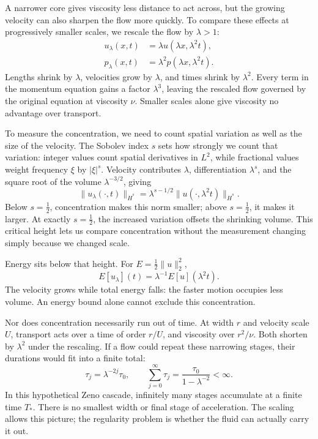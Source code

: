 A narrower core gives viscosity less distance to act across, but the
growing velocity can also sharpen the flow more quickly. To compare these
effects at progressively smaller scales, we rescale the flow by
\(\lambda>1\):
\[
 \begin{aligned}
 u_\lambda(x,t)&=\lambda u(\lambda x,\lambda^2t),\\
 p_\lambda(x,t)&=\lambda^2p(\lambda x,\lambda^2t).
 \end{aligned}
\]
Lengths shrink by \(\lambda\), velocities grow by \(\lambda\), and times
shrink by \(\lambda^2\). Every term in the momentum equation gains a
factor \(\lambda^3\), leaving the rescaled flow governed by the original
equation at viscosity \(\nu\). Smaller scales alone give viscosity no
advantage over transport.

To measure the concentration, we need to count spatial variation as well
as the size of the velocity. The Sobolev index \(s\) sets how strongly
we count that variation: integer values count spatial derivatives in
\(L^2\), while fractional values weight frequency \(\xi\) by
\(|\xi|^s\). Velocity contributes \(\lambda\), differentiation
\(\lambda^s\), and the square root of the volume \(\lambda^{-3/2}\), giving
\[
 \|u_\lambda(\cdot,t)\|_{\dot H^s}
 =\lambda^{s-1/2}\|u(\cdot,\lambda^2t)\|_{\dot H^s}.
\]
Below \(s=\tfrac12\), concentration makes this norm smaller; above
\(s=\tfrac12\), it makes it larger. At exactly \(s=\tfrac12\), the
increased variation offsets the shrinking volume. This critical height
lets us compare concentration without the measurement changing simply
because we changed scale.

Energy sits below that height. For \(E=\tfrac12\|u\|_2^2\),
\[
 E[u_\lambda](t)=\lambda^{-1}E[u](\lambda^2t).
\]
The velocity grows while total energy falls: the faster motion occupies
less volume. An energy bound alone cannot exclude this concentration.

Nor does concentration necessarily run out of time. At width \(r\) and
velocity scale \(U\), transport acts over a time of order \(r/U\), and
viscosity over \(r^2/\nu\). Both shorten by \(\lambda^2\) under the
rescaling. If a flow could repeat these narrowing stages, their durations
would fit into a finite total:
\[
 \tau_j=\lambda^{-2j}\tau_0,
 \qquad
 \sum_{j=0}^{\infty}\tau_j
 =\frac{\tau_0}{1-\lambda^{-2}}<\infty.
\]
In this hypothetical Zeno cascade, infinitely many stages accumulate at
a finite time \(T_*\). There is no smallest width or final stage of
acceleration. The scaling allows this picture; the regularity problem
is whether the fluid can actually carry it out.

